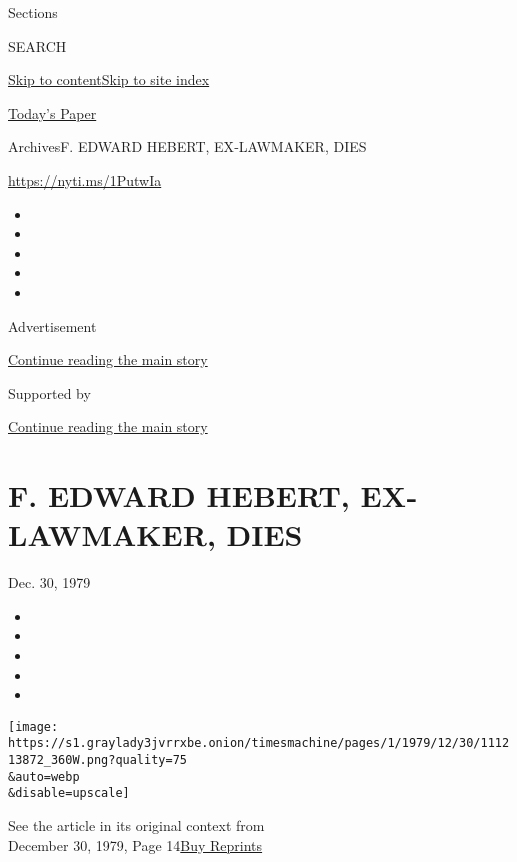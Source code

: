 Sections

SEARCH

\protect\hyperlink{site-content}{Skip to
content}\protect\hyperlink{site-index}{Skip to site index}

\href{https://myaccount.nytimes3xbfgragh.onion/auth/login?response_type=cookie\&client_id=vi}{}

\href{https://www.nytimes3xbfgragh.onion/section/todayspaper}{Today's
Paper}

Archives\textbar{}F. EDWARD HEBERT, EX‐LAWMAKER, DIES

\url{https://nyti.ms/1PutwIa}

\begin{itemize}
\item
\item
\item
\item
\item
\end{itemize}

Advertisement

\protect\hyperlink{after-top}{Continue reading the main story}

Supported by

\protect\hyperlink{after-sponsor}{Continue reading the main story}

\hypertarget{f-edward-hebert-exlawmaker-dies}{%
\section{F. EDWARD HEBERT, EX‐LAWMAKER,
DIES}\label{f-edward-hebert-exlawmaker-dies}}

Dec. 30, 1979

\begin{itemize}
\item
\item
\item
\item
\item
\end{itemize}

\texttt{[image: https://s1.graylady3jvrrxbe.onion/timesmachine/pages/1/1979/12/30/111213872\_360W.png?quality=75\\\&auto=webp\\\&disable=upscale]}

See the article in its original context from\\
December 30, 1979, Page
14\href{https://store.nytimes3xbfgragh.onion/collections/new-york-times-page-reprints?utm_source=nytimes\&utm_medium=article-page\&utm_campaign=reprints}{Buy
Reprints}

